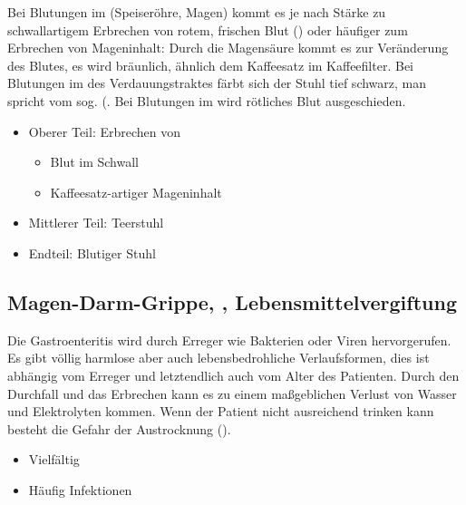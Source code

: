 \TextSlide{\TxSymptome}
{
Bei Blutungen im 
(Speiseröhre, Magen) kommt es je nach Stärke zu
schwallartigem Erbrechen  von rotem, frischen Blut
() oder häufiger zum Erbrechen von
Mageninhalt: Durch die Magensäure kommt es zur Veränderung
des Blutes, es wird bräunlich, ähnlich dem Kaffeesatz im
Kaffeefilter. Bei Blutungen im  des
Verdauungstraktes färbt sich der Stuhl tief schwarz, man
spricht vom sog.  (. Bei Blutungen im
 wird rötliches Blut ausgeschieden. 

}{
\begin{itemize}
  \item Oberer Teil: Erbrechen von
  \begin{itemize}
    \item Blut im Schwall
    \item Kaffeesatz-artiger Mageninhalt
  \end{itemize} 
  \item Mittlerer Teil: Teerstuhl
  \item Endteil: Blutiger Stuhl
\end{itemize}
}{}{}{}

\begin{Synopsis}
\end{Synopsis}





\subsection{Magen-Darm-Grippe, ,
Lebensmittelvergiftung}
\label{topic:gastroenteritis}%
\label{topic:lebensmittelvergiftung}%


{%
Die Gastroenteritis wird durch Erreger wie Bakterien oder
Viren hervorgerufen. Es gibt völlig harmlose aber auch
lebensbedrohliche Verlaufsformen, dies ist abhängig vom
Erreger und letztendlich auch vom Alter des Patienten. Durch
den Durchfall und das Erbrechen kann es zu einem maßgeblichen
Verlust von Wasser und Elektrolyten kommen. Wenn der Patient
nicht ausreichend trinken kann besteht die Gefahr der
Austrocknung (). 
}{
\begin{itemize}
  \item Vielfältig
  \item Häufig Infektionen
\end{itemize}
}{}{}{}


